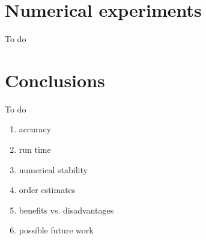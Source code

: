 \section{Numerical experiments}

{\color{red} To do}

\section{Conclusions}

{\color{red} To do}

\begin{enumerate}
    \item accuracy
    \item run time
    \item numerical stability
    \item order estimates
    \item benefits vs. disadvantages
    \item possible future work
\end{enumerate}


\stopchapter
